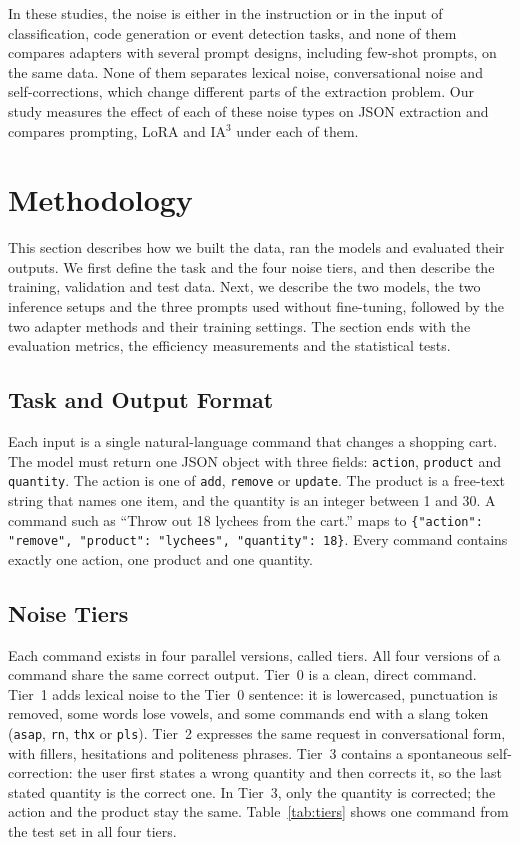 \documentclass[journal,article,submit,pdftex,moreauthors]{Definitions/mdpi}
\begin{document}
In these studies, the noise is either in the instruction or in the input of classification, code generation or event detection tasks, and none of them compares adapters with several prompt designs, including few-shot prompts, on the same data. None of them separates lexical noise, conversational noise and self-corrections, which change different parts of the extraction problem. Our study measures the effect of each of these noise types on JSON extraction and compares prompting, LoRA and IA$^3$ under each of them.

\section{Methodology}\label{sec:methods}

This section describes how we built the data, ran the models and evaluated their outputs. We first define the task and the four noise tiers, and then describe the training, validation and test data. Next, we describe the two models, the two inference setups and the three prompts used without fine-tuning, followed by the two adapter methods and their training settings. The section ends with the evaluation metrics, the efficiency measurements and the statistical tests.

\subsection{Task and Output Format}\label{sec:task}

Each input is a single natural-language command that changes a shopping cart. The model must return one JSON object with three fields: \texttt{action}, \texttt{product} and \texttt{quantity}. The action is one of \texttt{add}, \texttt{remove} or \texttt{update}. The product is a free-text string that names one item, and the quantity is an integer between 1 and 30. A command such as ``Throw out 18 lychees from the cart.'' maps to \texttt{\{"action": "remove", "product": "lychees", "quantity": 18\}}. Every command contains exactly one action, one product and one quantity.

\subsection{Noise Tiers}\label{sec:tiers}

Each command exists in four parallel versions, called tiers. All four versions of a command share the same correct output. Tier~0 is a clean, direct command. Tier~1 adds lexical noise to the Tier~0 sentence: it is lowercased, punctuation is removed, some words lose vowels, and some commands end with a slang token (\texttt{asap}, \texttt{rn}, \texttt{thx} or \texttt{pls}). Tier~2 expresses the same request in conversational form, with fillers, hesitations and politeness phrases. Tier~3 contains a spontaneous self-correction: the user first states a wrong quantity and then corrects it, so the last stated quantity is the correct one. In Tier~3, only the quantity is corrected; the action and the product stay the same. Table~\ref{tab:tiers} shows one command from the test set in all four tiers.
\end{document}
